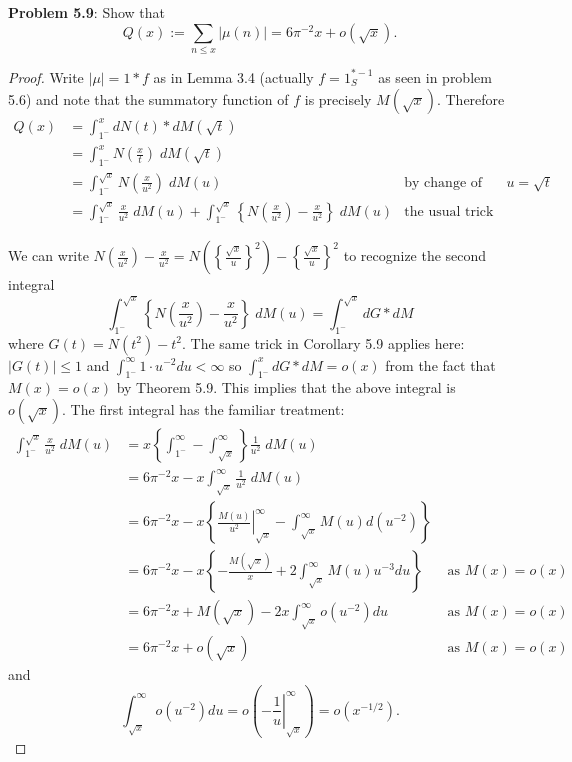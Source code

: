 \documentclass[12pt]{article}
\begin{document}
\fi

\textbf{Problem 5.9}: Show that
$$Q(x) := \sum_{n \leq x} |\mu(n)| = 6 \pi^{-2} x + o(\sqrt{x}).$$

\begin{proof}
Write $|\mu| = 1 * f$ as in Lemma 3.4 (actually $f = 1_S^{*-1}$ as seen in problem 5.6) and note that the summatory function of $f$ is precisely $M(\sqrt{x})$. Therefore
\begin{align*}
Q(x) &= \int_{1^-}^x dN(t) * dM(\sqrt{t})\\
&= \int_{1^-}^x N\left(\frac x t\right) \; dM(\sqrt{t})\\
&= \int_{1^-}^{\sqrt x} N\left(\frac{x}{u^2}\right) \; dM(u) &\text{by change of variable } u = \sqrt{t}\\
&= \int_{1^-}^{\sqrt x} \frac{x}{u^2} \; dM(u) + \int_{1^-}^{\sqrt x} \left\{ N\left(\frac{x}{u^2}\right) - \frac{x}{u^2} \right\} \; dM(u) &\text{the usual trick}
\end{align*}

We can write $N\left(\frac{x}{u^2}\right) - \frac{x}{u^2} = N\left(\left\{\frac{\sqrt x}{u}\right\}^2\right) - \left\{\frac{\sqrt x}{u}\right\}^2$ to recognize the second integral
$$\int_{1^-}^{\sqrt x} \left\{ N\left(\frac{x}{u^2}\right) - \frac{x}{u^2} \right\} \; dM(u) = \int_{1^-}^{\sqrt x} dG * dM$$
where $G(t) = N(t^2) - t^2$. The same trick in Corollary 5.9 applies here: $|G(t)| \leq 1$ and $\int_{1^-}^{\infty} 1 \cdot u^{-2} du < \infty$ so $\int_{1^-}^{x} dG * dM = o(x)$ from the fact that $M(x) = o(x)$ by Theorem 5.9. This implies that the above integral is $o(\sqrt x)$. The first integral has the familiar treatment:
\begin{align*}
\int_{1^-}^{\sqrt x} \frac{x}{u^2} \; dM(u) &= x \left\{ \int_{1^-}^{\infty} - \int_{\sqrt x}^{\infty} \right\} \frac{1}{u^2} \; dM(u)\\
&= 6 \pi^{-2} x - x \int_{\sqrt x}^{\infty} \frac{1}{u^2} \; dM(u)\\
&= 6 \pi^{-2} x - x \left\{ \left. \frac{M(u)}{u^2} \right|_{\sqrt x}^{\infty} - \int_{\sqrt x}^{\infty} M(u) d(u^{-2}) \right\}\\
&= 6 \pi^{-2} x - x \left\{ -\frac{M(\sqrt x)}{x} + 2 \int_{\sqrt x}^{\infty} M(u) u^{-3} du \right\} &\text{ as } M(x) = o(x)\\
&= 6 \pi^{-2} x + M(\sqrt{x}) - 2 x \int_{\sqrt x}^{\infty} o(u^{-2}) du &\text{ as } M(x) = o(x)\\
&= 6 \pi^{-2} x + o(\sqrt{x}) &\text{ as } M(x) = o(x)
\end{align*}
and
$$\int_{\sqrt x}^{\infty} o(u^{-2}) du = o\left( \left. -\frac{1}{u} \right|_{\sqrt x}^{\infty} \right) = o(x^{-1/2}).$$
\end{proof}

\unless\ifdefined\IsMainDocument
\end{document}
